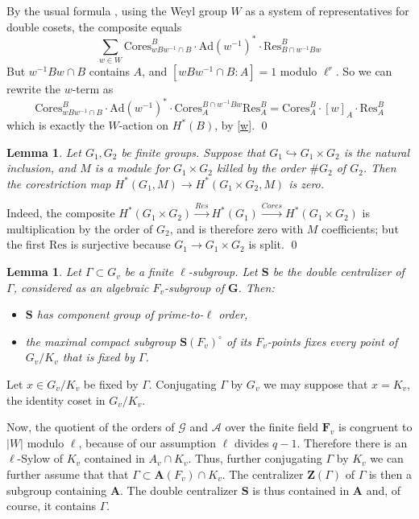 \documentclass[10pt]{amsart}
\newcommand{\Cores}{\mathrm{Cores}}
\newcommand{\Res}{\mathrm{Res}}
\newcommand{\Ad}{\mathrm{Ad}}
\newtheorem{lemma}[subsection]{Lemma}
\theoremstyle{remark}
\begin{document}
  
  
By the  usual formula \cite[Proposition 9.5]{Brown}, using the Weyl group $W$ as a system of representatives for double cosets,
the composite equals
$$\sum_{w \in W}  \mathrm{Cores}_{w  B w^{-1} \cap B}^B  \cdot \Ad(w^{-1})^* \cdot \mathrm{Res}^{B}_{B \cap w^{-1} B w}  $$
But $w^{-1} B w \cap B$ contains  $A$, and  $[w B w^{-1} \cap B: A] =1$ modulo $\ell^r$.  So we can rewrite the $w$-term as 
$$ \mathrm{Cores}_{w  B w^{-1} \cap B}^B  \cdot \Ad(w^{-1})^* \cdot  \mathrm{Cores}_{A}^{B \cap w^{-1} B w }  \mathrm{Res}^{B}_{A} = \Cores_{A}^{B} \cdot [w]_A \cdot \Res^B_A  $$
which is exactly the $W$-action on $H^*(B)$, by  \eqref{w}. \qed 

\begin{lemma}\label{ff2}  Let $G_1, G_2$ be finite groups. Suppose that $G_1 \hookrightarrow G_1 \times G_2$ is the natural inclusion, and $M$ is a module for $G_1 \times G_2$
 killed by  the order $\# G_2$ of $G_2$. Then the corestriction map $H^*(G_1, M) \rightarrow H^*(G_1 \times G_2, M)$
 is zero. 
 \end{lemma}
 \proof Indeed, the composite $H^*(G_1 \times G_2) \stackrel{Res}{\rightarrow} H^*(G_1) \stackrel{Cores}{\rightarrow} H^*(G_1 \times G_2)$
 is multiplication by the order  of $G_2$, and is therefore zero with $M$ coefficients; but the first $\mathrm{Res}$ is surjective
 because $G_1 \rightarrow G_1 \times G_2$ is split. 
\qed  


\begin{lemma}  \label{doublecentralizer} 
 Let $\Gamma \subset G_v$ be a finite $\ell$-subgroup.
 Let $\mathbf{S}$ be the double centralizer of $\Gamma$,
 considered as an algebraic $F_v$-subgroup of $\mathbf{G}$.
 Then:
   \begin{itemize}
  \item[(a)] $\mathbf{S}$ 
 has component group of prime-to-$\ell$ order, 
 \item[(b)]   the maximal compact subgroup $\mathbf{S}(F_v)^{\circ}$ of its $F_v$-points fixes
 every point of $G_v/K_v$ that is fixed by $\Gamma$. 
 \end{itemize} 
  
  \end{lemma}
\proof  Let $x \in G_v/K_v$ be fixed by $\Gamma$. Conjugating $\Gamma$ by $G_v$ we may suppose that $x=K_v$, the identity coset
 in $G_v/K_v$. 

 Now, the quotient of  the orders of $\mathcal{G}$ and $\mathcal{A}$
 over the finite field $\mathbf{F}_v$ is congruent to $|W|$ modulo $\ell$, because of our assumption $\ell$ divides $q-1$. Therefore there is an $\ell$-Sylow of $K_v$ contained in $A_v \cap K_v$.
%
%
%
%
Thus, further conjugating $\Gamma$ by $K_v$ we can further assume that 
 that $\Gamma \subset \mathbf{A}(F_v) \cap K_v$.   The centralizer $\mathbf{Z}(\Gamma)$ of $\Gamma$ is then a subgroup containing $\mathbf{A}$.
  The double centralizer $\mathbf{S}$ is  thus contained in $\mathbf{A}$ and, of course, it contains $\Gamma$. 
  
\end{document}
